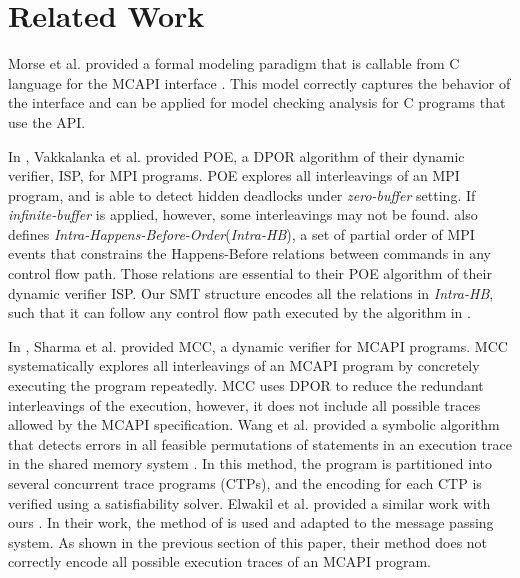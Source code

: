 \section{Related Work}
Morse et al. provided a formal modeling paradigm that is callable from C language for the MCAPI interface \cite{morse:vmcai12}. This model correctly captures the behavior of the interface and can be applied for model checking analysis for C programs that use the API.

In \cite{sarvani:fm09}, Vakkalanka et al. provided POE, a DPOR algorithm \cite{flanagan:popl05} of their dynamic verifier, ISP, for MPI programs. POE explores all interleavings of an MPI program, and is able to detect hidden deadlocks under \textit{zero-buffer} setting. If \textit{infinite-buffer} is applied, however, some interleavings may not be found. \cite{sarvani:fm09} also defines \textit{Intra-Happens-Before-Order}(\textit{Intra-HB}), a set of partial order of MPI events that constrains the Happens-Before relations between commands in any control flow path. Those relations are essential to their POE algorithm of their dynamic verifier ISP. Our SMT structure encodes all the relations in \textit{Intra-HB}, such that it can follow any control flow path executed by the algorithm in \cite{sarvani:fm09}. 

In \cite{sharma:fmcad09}, Sharma et al. provided MCC, a dynamic verifier for MCAPI programs. MCC systematically explores all interleavings of an MCAPI program by concretely executing the program repeatedly. MCC uses DPOR \cite{flanagan:popl05} to reduce the redundant interleavings of the execution, however, it does not include all possible traces allowed by the MCAPI specification. Wang et al. provided a symbolic algorithm that detects errors in all feasible permutations of statements in an execution trace in the shared memory system \cite{wang:fse09}. In this method, the program is partitioned into several concurrent trace programs (CTPs), and the encoding for each CTP is verified using a satisfiability solver. Elwakil et al. provided a similar work with ours \cite{elwakil:atva10,elwakil:padtad10}. In their work, the method of \cite{wang:fse09} is used and adapted to the message passing system. As shown in the previous section of this paper, their method does not correctly encode all possible execution traces of an MCAPI program.

